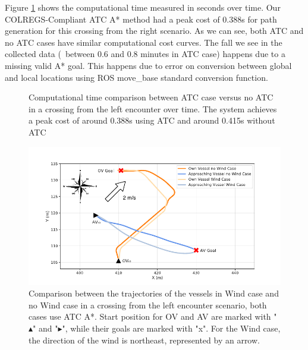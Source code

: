         Figure \ref{fig:plot_cl_w_vs_wo_CT} shows the computational time measured in seconds over time. Our \ac{COLREGS}-Compliant \ac{ATC} A* method had a peak cost of 0.388s for path generation for this crossing from the right scenario. As we can see, both \ac{ATC} and no \ac{ATC} cases have similar computational cost curves. The fall we see in the collected data (\eg{}~between 0.6 and 0.8 minutes in ATC case) happens due to a missing valid A* goal. This happens due to error on conversion between global and local locations using ROS move\_base standard conversion function.
        
        \begin{figure}[H]
            \centering
                
                \caption{Computational time comparison between \ac{ATC} case versus no \ac{ATC} in a crossing from the left encounter over time. The system achieves a peak cost of around 0.388s using \ac{ATC} and around 0.415s without \ac{ATC}}
                \label{fig:plot_cl_w_vs_wo_CT}
        \end{figure}
        
        
        \begin{figure}[H]
            \centering
            \includegraphics[width=\textwidth]{figs/Chap5/plot_cl_w_vs_wind.pdf}
            \caption{Comparison between the trajectories of the vessels in Wind case and no Wind case in a crossing from the left encounter scenario, both cases use \ac{ATC} A*. Start position for \ac{OV} and \ac{AV} are marked with "$\blacktriangle$" and "$\blacktriangleright$", while their goals are marked with "x". For the Wind case, the direction of the wind is northeast, represented by an arrow.}
            \label{fig:plot_cl_w_vs_wind}
        \end{figure}
        

